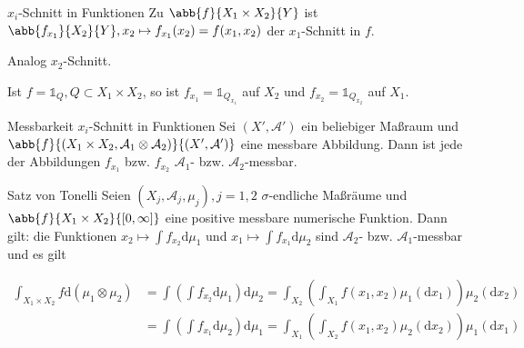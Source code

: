 \begin{karte}{\(x_i\)-Schnitt in Funktionen}
    Zu \( \abb{f}{X_1\times X_2}{Y} \) ist 
    \( \abb{f_{x_1}}{X_2}{Y}, x_2 \mapsto f_{x_1}(x_2) = f(x_1, x_2) \) der \( x_1 \)-Schnitt in \(f\).

    Analog \(x_2\)-Schnitt.

    Ist \( f = \mathds{1}_Q, Q \subset X_1 \times X_2 \), so ist 
    \( f_{x_1} = \mathds{1}_{Q_{x_1}} \) auf \(X_2\) und \( f_{x_2} = \mathds{1}_{Q_{x_2}} \) 
    auf \(X_1\).
\end{karte}

\begin{karte}{Messbarkeit \(x_i\)-Schnitt in Funktionen}
    Sei \( (X', \mathcal{A}') \) ein beliebiger Maßraum 
    und \( \abb{f}{(X_1\times X_2, \mathcal{A}_1 \otimes \mathcal{A}_2)}{(X', \mathcal{A}')} \)
    eine messbare Abbildung. Dann ist jede der Abbildungen \( f_{x_1} \) bzw. \( f_{x_2} \)
    \( \mathcal{A}_1 \)- bzw. \(\mathcal{A}_2\)-messbar.
\end{karte}

\begin{karte}{Satz von Tonelli}
    Seien \( (X_j, \mathcal{A}_j, \mu_j), j=1,2 \) \(\sigma\)-endliche Maßräume 
    und \( \abb{f}{X_1 \times X_2}{[0,\infty]} \) eine positive messbare 
    numerische Funktion. Dann gilt: die Funktionen \( x_2 \mapsto \int f_{x_2} \mathrm{d}\mu_1 \)
    und \( x_1 \mapsto \int f_{x_1} \mathrm{d}\mu_2 \) sind \( \mathcal{A}_2 \)- bzw. 
    \( \mathcal{A}_1 \)-messbar und es gilt 

    \begin{align*}
        \int_{X_1\times X_2} f \mathrm{d}(\mu_1\otimes\mu_2) &= \int \left( \int f_{x_2}\mathrm{d}\mu_1 \right) \mathrm{d}\mu_2 = \int_{X_2} \left( \int_{X_1} f(x_1, x_2) \mu_1(\mathrm{d}x_1) \right) \mu_2(\mathrm{d}x_2) \\
        &= \int \left(\int f_{x_1} \mathrm{d}\mu_2 \right) \mathrm{d}\mu_1 = \int_{X_1} \left( \int_{X_2} f(x_1, x_2) \mu_2(\mathrm{d}x_2) \right) \mu_1(\mathrm{d}x_1)
    \end{align*}
\end{karte}

